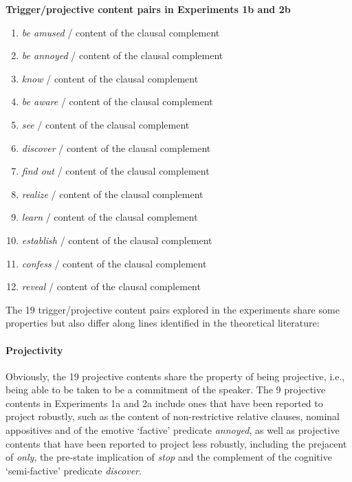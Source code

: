 \documentclass[11pt,fleqn]{article}
\newcommand{\6}{\mbox{$[\hspace*{-.6mm}[$}}
\newcommand{\9}{\mbox{$]\hspace*{-.6mm}]$}}
\begin{document}
\begin{exe}
\begin{enumerate}[itemsep=-.5mm]
\end{enumerate}


\ex\label{pairs1b2b} {\bf Trigger/projective content pairs in Experiments 1b and 2b}

\begin{enumerate}[itemsep=-.5mm]

\item {\em be amused} / content of the clausal complement

\item {\em be annoyed} / content of the clausal complement

\item {\em know} / content of the clausal complement

\item {\em be aware} / content of the clausal complement

\item {\em see} / content of the clausal complement

\item {\em discover} / content of the clausal complement

\item {\em find out} / content of the clausal complement

\item {\em realize} / content of the clausal complement

\item {\em learn} / content of the clausal complement

\item {\em establish} / content of the clausal complement

\item {\em confess} / content of the clausal complement

\item {\em reveal} / content of the clausal complement

\end{enumerate}

\end{exe}

The 19 trigger/projective content pairs explored in the experiments share some properties but also differ along lines identified in the theoretical literature:

\paragraph{Projectivity} Obviously, the 19 projective contents share the property of being projective, i.e., being able to be taken to be a commitment of the speaker. The 9 projective contents in Experiments 1a and 2a include ones that have been reported to project robustly, such as the content of non-restrictive relative clauses, nominal appositives and of the emotive `factive' predicate {\em annoyed}, as well as projective contents that have been reported to project less robustly, including the prejacent of {\em only}, the pre-state implication of {\em stop} and the complement of the cognitive `semi-factive' predicate {\em discover}. 
\end{document}
